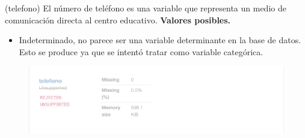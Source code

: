 
\begin{variable}(telefono) 
El número de teléfono es una variable que representa un medio de comunicación directa al centro educativo. 
\bigbreak 
\textbf{Valores posibles.}
\begin{itemize}
	\item Indeterminado, no parece ser una variable determinante en la base de datos. Esto se produce ya que se intentó tratar como variable categórica. 
\end{itemize}
\begin{figure}[H]
	\centering
	\includegraphics[scale=0.5]{Images/17}
\end{figure}
\end{variable}
















